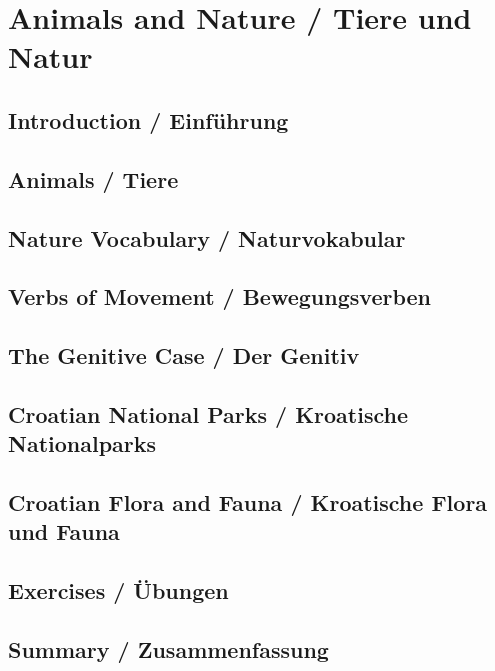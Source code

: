 \chapter{Animals and Nature / Tiere und Natur}

\section{Introduction / Einführung}

\section{Animals / Tiere}

\section{Nature Vocabulary / Naturvokabular}

\section{Verbs of Movement / Bewegungsverben}

\section{The Genitive Case / Der Genitiv}

\section{Croatian National Parks / Kroatische Nationalparks}

\section{Croatian Flora and Fauna / Kroatische Flora und Fauna}

\section{Exercises / Übungen}

\section{Summary / Zusammenfassung}
